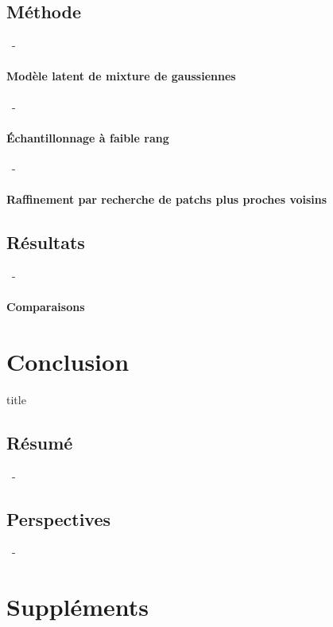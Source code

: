 \documentclass[aspectratio=169, 22pt]{beamer}
\begin{document}
\subsection{Méthode}
\begin{frame}{\secname~- \subsecname}
  \framesubtitle{Modèle latent de mixture de gaussiennes}
\end{frame}

\begin{frame}{\secname~- \subsecname}
  \framesubtitle{Échantillonnage à faible rang}
\end{frame}

\begin{frame}{\secname~- \subsecname}
  \framesubtitle{Raffinement par recherche de patchs plus proches voisins}
\end{frame}

\subsection{Résultats}
\begin{frame}{\secname~- \subsecname}
  \framesubtitle{Comparaisons}
\end{frame}
\section{Conclusion}
\begin{frame}
  \begin{beamercolorbox}[sep=15pt,center,shadow=true,rounded=true]{title}
    \LARGE\bfseries \secname
  \end{beamercolorbox}
\end{frame}

\subsection{Résumé}
\begin{frame}{\secname~- \subsecname}
\end{frame}

\subsection{Perspectives}
\begin{frame}{\secname~- \subsecname}
\end{frame}

\makethanks

\section{Suppléments}
\end{document}
